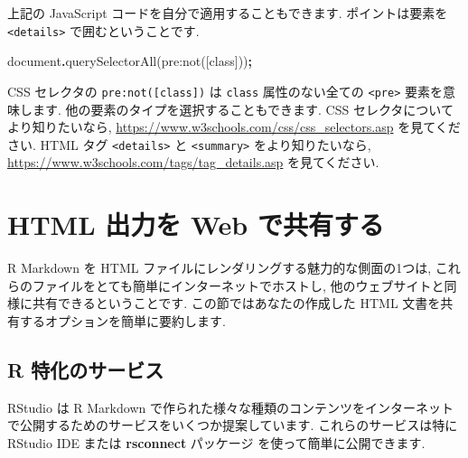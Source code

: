 \documentclass[
  11pt,
  lualatex,
  ja=standard]{bxjsreport}
\newenvironment{Shaded}{\begin{snugshade}}{\end{snugshade}}
\newcommand{\BuiltInTok}[1]{#1}
\newcommand{\FunctionTok}[1]{\textcolor[rgb]{0.00,0.00,0.00}{#1}}
\newcommand{\NormalTok}[1]{#1}
\newcommand{\OperatorTok}[1]{\textcolor[rgb]{0.81,0.36,0.00}{\textbf{#1}}}
\newcommand{\StringTok}[1]{\textcolor[rgb]{0.31,0.60,0.02}{#1}}
\begin{document}
上記の JavaScript コードを自分で適用することもできます. ポイントは要素を \texttt{\textless{}details\textgreater{}} で囲むということです.

\begin{Shaded}
\begin{Highlighting}[]
\BuiltInTok{document}\OperatorTok{.}\FunctionTok{querySelectorAll}\NormalTok{(}\StringTok{\textquotesingle{}pre:not([class])\textquotesingle{}}\NormalTok{)}\OperatorTok{;}
\end{Highlighting}
\end{Shaded}

CSS セレクタの \texttt{pre:not({[}class{]})} は \texttt{class} 属性のない全ての \texttt{\textless{}pre\textgreater{}} 要素を意味します. 他の要素のタイプを選択することもできます. CSS セレクタについてより知りたいなら, \url{https://www.w3schools.com/css/css_selectors.asp} を見てください. HTML タグ \texttt{\textless{}details\textgreater{}} と \texttt{\textless{}summary\textgreater{}} をより知りたいなら, \url{https://www.w3schools.com/tags/tag_details.asp} を見てください.

\hypertarget{html-share}{%
\section{HTML 出力を Web で共有する}\label{html-share}}

R Markdown を HTML ファイルにレンダリングする魅力的な側面の1つは, これらのファイルをとても簡単にインターネットでホストし, 他のウェブサイトと同様に共有できるということです. この節ではあなたの作成した HTML 文書を共有するオプションを簡単に要約します.

\hypertarget{r-specific-services}{%
\subsection{R 特化のサービス}\label{r-specific-services}}

RStudio は R Markdown で作られた様々な種類のコンテンツをインターネットで公開するためのサービスをいくつか提案しています. これらのサービスは特に RStudio IDE または \textbf{rsconnect} パッケージ \autocite{R-rsconnect} を使って簡単に公開できます.
\end{document}
